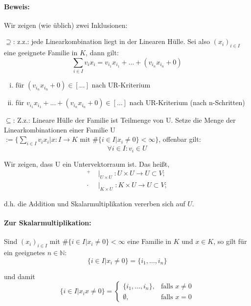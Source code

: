 \paragraph{Beweis:}
	Wir zeigen (wie üblich) zwei Inklusionen:	

	$\supseteq$: z.z.: jede Linearkombination liegt in der Linearen Hülle. Sei also $(x_i)_{i\in I}$ eine geeignete Familie in $ K $, dann gilt:
	\begin{equation*}
		\sum_{i\in I} v_i x_i = v_{i_1} x_{i_1} + ... + (v_{i_n}x_{i_n}+0)
	\end{equation*}

	\begin{enumerate}[(i)]
		\item $\text{für } (v_{i_n}x_{i_n}+0) \in [...] \text{ nach UR-Kriterium}$
		\item für $v_{i_1}x_{i_1} + ... + (v_{i_n}x_{i_n}+0) \in [...]$ nach UR-Kriterium (nach n-Schritten)
	\end{enumerate}

	$\subseteq$: Z.z.: Lineare Hülle der Familie ist Teilmenge von U. Setze die Menge der Linearkombinationen einer Familie U $:= \{{\sum_{i\in I} v_ix_i| x: I\to K \text{ mit } \#\{{i\in I| x_i \neq 0\}} < \infty\}}$, offenbar gilt:
	\begin{equation*}
		\forall i\in I: v_i\in U
	\end{equation*}

	Wir zeigen, dass U ein Untervektorraum ist. Das heißt,
	\begin{align*}
	^+    & \mid_{U\times U}: U\times U \to U \subset V;\\
	\cdot & \mid_{K\times U}: K\times U \to U \subset V;
	\end{align*}
	
	d.h. die Addition und Skalarmultiplikation vererben sich auf $ U $.

\paragraph{Zur Skalarmultiplikation:}
	Sind $(x_i)_{i\in I}$ mit $\#\{i\in I| x_i \neq 0\}<\infty$ eine Familie in $ K $ und $x\in K$, so gilt für ein geeignetes $n\in \mathbb{N}$:
	\begin{equation*}
		\{i\in I| x_i \neq 0\} = \{i_1, ... , i_n\}
	\end{equation*}

	und damit 
	\begin{equation*}
		\{i\in I| x_ix\neq 0\} =
		\begin{cases}
			\{{i_1,...,i_n\}},& \text{falls }x \neq 0\\
			\emptyset,& \text{falls }x = 0
		\end{cases}
	\end{equation*}

